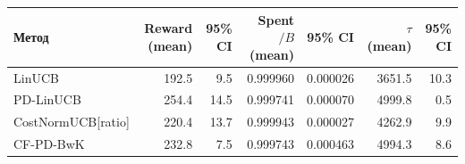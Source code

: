 \begin{tabular}{lrrrrrr}
\toprule
Метод & Reward (mean) & 95\% CI & Spent$/B$ (mean) & 95\% CI & $\tau$ (mean) & 95\% CI \\
\midrule
LinUCB & 192.5 & 9.5 & 0.999960 & 0.000026 & 3651.5 & 10.3 \\
PD-LinUCB & 254.4 & 14.5 & 0.999741 & 0.000070 & 4999.8 & 0.5 \\
CostNormUCB[ratio] & 220.4 & 13.7 & 0.999943 & 0.000027 & 4262.9 & 9.9 \\
CF-PD-BwK & 232.8 & 7.5 & 0.999743 & 0.000463 & 4994.3 & 8.6 \\
\bottomrule
\end{tabular}
